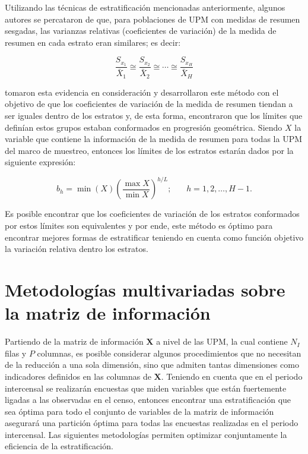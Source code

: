 \documentclass[
  12pt,
  spanish,
]{book}
\begin{document}
Utilizando las técnicas de estratificación mencionadas anteriormente, algunos autores se percataron de que, para poblaciones de UPM con medidas de resumen sesgadas, las varianzas relativas (coeficientes de variación) de la medida de resumen en cada estrato eran similares; es decir:

\[
\frac{S_{x_1}}{\bar{X}_1} \cong \frac{S_{x_2}}{\bar{X}_2} \cong \cdots \cong\frac{S_{x_H}}{\bar{X}_H}  
\]

\citet{Gunning_Horgan_2004} tomaron esta evidencia en consideración y desarrollaron este método con el objetivo de que los coeficientes de variación de la medida de resumen tiendan a ser iguales dentro de los estratos y, de esta forma, encontraron que los límites que definían estos grupos estaban conformados en progresión geométrica. Siendo \(X\) la variable que contiene la información de la medida de resumen para todas la UPM del marco de muestreo, entonces los límites de los estratos estarán dados por la siguiente expresión:

\[
b_h = \min(X) \left( \frac{\max X}{\min X} \right) ^ {h/L}; \ \ \ \ \ \ \ \ h = 1, 2, \ldots, H-1.
\]

Es posible encontrar que los coeficientes de variación de los estratos conformados por estos límites son equivalentes y por ende, este método es óptimo para encontrar mejores formas de estratificar teniendo en cuenta como función objetivo la variación relativa dentro los estratos.

\hypertarget{metodologuxedas-multivariadas-sobre-la-matriz-de-informaciuxf3n}{%
\section{Metodologías multivariadas sobre la matriz de información}\label{metodologuxedas-multivariadas-sobre-la-matriz-de-informaciuxf3n}}

Partiendo de la matriz de información \(\mathbf{X}\) a nivel de las UPM, la cual contiene \(N_I\) filas y \(P\) columnas, es posible considerar algunos procedimientos que no necesitan de la reducción a una sola dimensión, sino que admiten tantas dimensiones como indicadores definidos en las columnas de \(\mathbf{X}\). Teniendo en cuenta que en el periodo intercensal se realizarán encuestas que miden variables que están fuertemente ligadas a las observadas en el censo, entonces encontrar una estratificación que sea óptima para todo el conjunto de variables de la matriz de información asegurará una partición óptima para todas las encuestas realizadas en el periodo intercensal. Las siguientes metodologías permiten optimizar conjuntamente la eficiencia de la estratificación.
\end{document}

